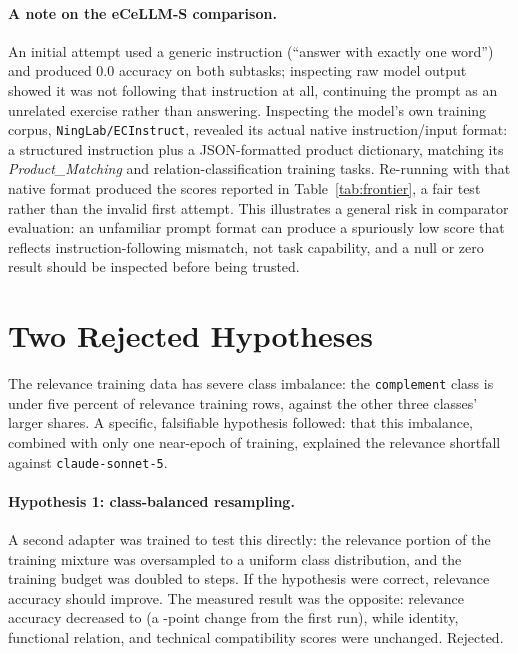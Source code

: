 \documentclass{article}
\newcommand{\code}[1]{\texttt{#1}}
\begin{document}
\paragraph{A note on the eCeLLM-S comparison.} An initial attempt used a generic instruction (``answer with exactly one word'') and produced 0.0 accuracy on both subtasks; inspecting raw model output showed it was not following that instruction at all, continuing the prompt as an unrelated exercise rather than answering. Inspecting the model's own training corpus, \code{NingLab/ECInstruct}, revealed its actual native instruction/input format: a structured instruction plus a JSON-formatted product dictionary, matching its \emph{Product\_Matching} and relation-classification training tasks. Re-running with that native format produced the scores reported in Table~\ref{tab:frontier}, a fair test rather than the invalid first attempt. This illustrates a general risk in comparator evaluation: an unfamiliar prompt format can produce a spuriously low score that reflects instruction-following mismatch, not task capability, and a null or zero result should be inspected before being trusted.

\section{Two Rejected Hypotheses}
\label{sec:v2}
The relevance training data has severe class imbalance: the \code{complement} class is under five percent of relevance training rows, against the other three classes' larger shares. A specific, falsifiable hypothesis followed: that this imbalance, combined with only one near-epoch of training, explained the relevance shortfall against \code{claude-sonnet-5}.

\paragraph{Hypothesis 1: class-balanced resampling.} A second adapter was trained to test this directly: the relevance portion of the training mixture was oversampled to a uniform class distribution, and the training budget was doubled to \AdapterTwoTrainSteps{} steps. If the hypothesis were correct, relevance accuracy should improve. The measured result was the opposite: relevance accuracy decreased to \AdapterTwoRelevanceAcc{} (a \AdapterTwoRelevanceDelta{}-point change from the first run), while identity, functional relation, and technical compatibility scores were unchanged. Rejected.
\end{document}
